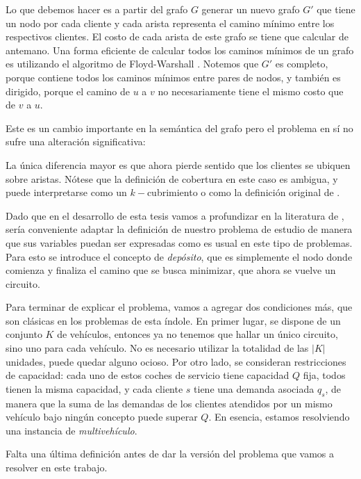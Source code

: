 Lo que debemos hacer es a partir del grafo $G$ generar un nuevo grafo $G'$ que tiene un nodo por cada cliente y cada arista representa el camino mínimo entre los respectivos clientes. El costo de cada arista de este grafo se tiene que calcular de antemano. Una forma eficiente de calcular todos los caminos mínimos de un grafo es utilizando el algoritmo de Floyd-Warshall \cite{cormen}. Notemos que $G'$ es completo, porque contiene todos los caminos mínimos entre pares de nodos, y también es dirigido, porque el camino de $u$ a $v$ no necesariamente tiene el mismo costo que de $v$ a $u$.

Este es un cambio importante en la semántica del grafo pero el problema en sí no sufre una alteración significativa:


La única diferencia mayor es que ahora pierde sentido que los clientes se ubiquen sobre aristas. Nótese que la definición de cobertura en este caso es ambigua, y puede interpretarse como un $k-$cubrimiento o como la definición original de .

Dado que en el desarrollo de esta tesis vamos a profundizar en la literatura de , sería conveniente adaptar la definición de nuestro problema de estudio de manera que sus variables puedan ser expresadas como es usual en este tipo de problemas. Para esto se introduce el concepto de \emph{depósito}, que es simplemente el nodo donde comienza y finaliza el camino que se busca minimizar, que ahora se vuelve un circuito. 

Para terminar de explicar el problema, vamos a agregar dos condiciones más, que son clásicas en los problemas de esta índole. En primer lugar, se dispone de un conjunto $K$ de vehículos, entonces ya no tenemos que hallar un único circuito, sino uno para cada vehículo. No es necesario utilizar la totalidad de las $|K|$ unidades, puede quedar alguno ocioso. Por otro lado, se consideran restricciones de capacidad: cada uno de estos coches de servicio tiene capacidad $Q$ fija, todos tienen la misma capacidad, y cada cliente $s$ tiene una demanda asociada $q_s$, de manera que la suma de las demandas de los clientes atendidos por un mismo vehículo bajo ningún concepto puede superar $Q$. En esencia, estamos resolviendo una instancia de  \emph{multivehículo}.

Falta una última definición antes de dar la versión del problema que vamos a resolver en este trabajo. 

